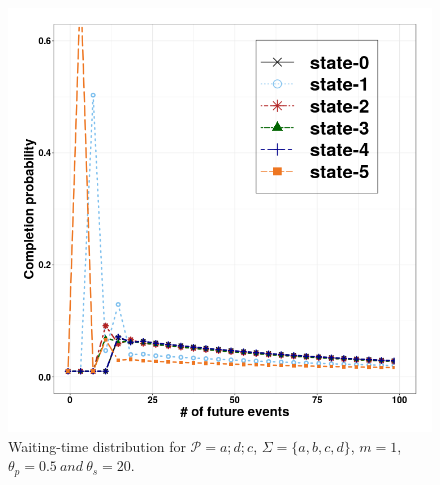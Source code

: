 \begin{figure}[H]
	\begin{centering}
		\center
		\includegraphics[width=\textwidth]{chapters/figures/wt_v2.png}
		
		
		\caption{Waiting-time distribution for
			$\mathcal{P}=a ; d ; c$, $\Sigma=\{a,b,c,d\}$, $m=1$, $\theta_{p}=0.5\ and\ \theta_{s}=20$.}
		\label{fig:wt1}
	\end{centering}
\end{figure}

